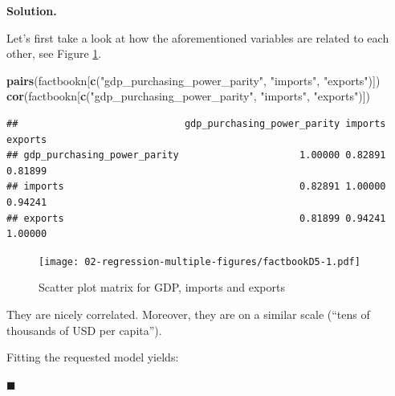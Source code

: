\documentclass[10pt,b5paper,krantz1]{krantz}
\newenvironment{Shaded}{\begin{snugshade}}{\end{snugshade}}
\newcommand{\CommentTok}[1]{\textcolor[rgb]{0.37,0.37,0.37}{\textit{#1}}}
\newcommand{\DataTypeTok}[1]{\textcolor[rgb]{0.27,0.27,0.27}{#1}}
\newcommand{\DecValTok}[1]{\textcolor[rgb]{0.06,0.06,0.06}{#1}}
\newcommand{\KeywordTok}[1]{\textcolor[rgb]{0.27,0.27,0.27}{\textbf{#1}}}
\newcommand{\NormalTok}[1]{#1}
\newcommand{\OperatorTok}[1]{\textcolor[rgb]{0.43,0.43,0.43}{\textbf{#1}}}
\newcommand{\StringTok}[1]{\textcolor[rgb]{0.5,0.5,0.5}{#1}}
\newenvironment{solution}{%
\bigskip\noindent\textbf{Solution. }%
\it\ignorespaces%
\ignorespaces%
}{\ignorespaces%
\hfill$\blacksquare$%
}
\begin{document}
\begin{solution}

Let's first take a look at how the aforementioned variables
are related to each other, see Figure \ref{fig:factbookD5}.

\begin{Shaded}
\begin{Highlighting}[]
\KeywordTok{pairs}\NormalTok{(factbookn[}\KeywordTok{c}\NormalTok{(}\StringTok{"gdp_purchasing_power_parity"}\NormalTok{, }\StringTok{"imports"}\NormalTok{, }\StringTok{"exports"}\NormalTok{)])}
\KeywordTok{cor}\NormalTok{(factbookn[}\KeywordTok{c}\NormalTok{(}\StringTok{"gdp_purchasing_power_parity"}\NormalTok{, }\StringTok{"imports"}\NormalTok{, }\StringTok{"exports"}\NormalTok{)])}
\end{Highlighting}
\end{Shaded}

\begin{verbatim}
##                             gdp_purchasing_power_parity imports exports
## gdp_purchasing_power_parity                     1.00000 0.82891 0.81899
## imports                                         0.82891 1.00000 0.94241
## exports                                         0.81899 0.94241 1.00000
\end{verbatim}

\begin{figure}
\hypertarget{fig:factbookD5}{%
\centering
\texttt{[image: 02-regression-multiple-figures/factbookD5-1.pdf]}
\caption{Scatter plot matrix for GDP, imports and exports}\label{fig:factbookD5}
}
\end{figure}

They are nicely correlated. Moreover, they are on a similar scale
(``tens of thousands of USD per capita'').

Fitting the requested model yields:

\begin{Shaded}
\end{Shaded}


\end{solution}
\end{document}
